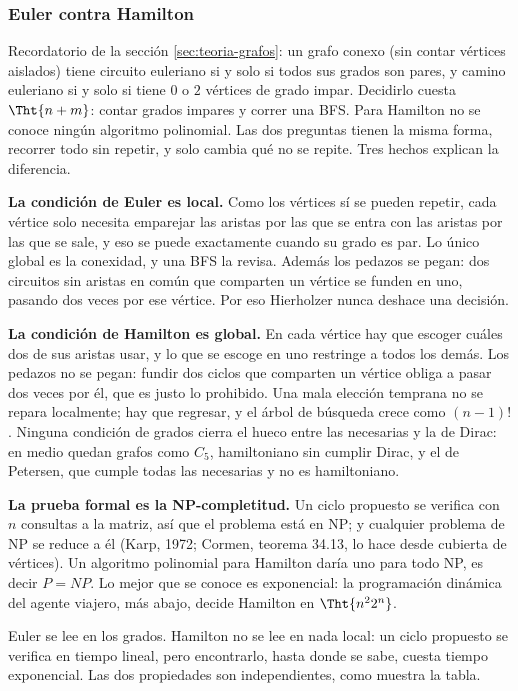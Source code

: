 \documentclass[11pt,letterpaper]{article}
\begin{document}

\subsubsection*{Euler contra Hamilton}

Recordatorio de la sección \ref{sec:teoria-grafos}: un grafo conexo
(sin contar vértices aislados) tiene circuito euleriano si y solo si
todos sus grados son pares, y camino euleriano si y solo si tiene $0$
o $2$ vértices de grado impar. Decidirlo cuesta $\Tht{n + m}$: contar
grados impares y correr una BFS. Para Hamilton no se conoce ningún
algoritmo polinomial. Las dos preguntas tienen la misma forma,
recorrer todo sin repetir, y solo cambia qué no se repite. Tres
hechos explican la diferencia.

\textbf{La condición de Euler es local.} Como los vértices sí se
pueden repetir, cada vértice solo necesita emparejar las aristas por
las que se entra con las aristas por las que se sale, y eso se puede
exactamente cuando su grado es par. Lo único global es la conexidad,
y una BFS la revisa. Además los pedazos se pegan: dos circuitos sin
aristas en común que comparten un vértice se funden en uno, pasando
dos veces por ese vértice. Por eso Hierholzer nunca deshace una
decisión.

\textbf{La condición de Hamilton es global.} En cada vértice hay que
escoger cuáles dos de sus aristas usar, y lo que se escoge en uno
restringe a todos los demás. Los pedazos no se pegan: fundir dos
ciclos que comparten un vértice obliga a pasar dos veces por él, que
es justo lo prohibido. Una mala elección temprana no se repara
localmente; hay que regresar, y el árbol de búsqueda crece como
$(n-1)!$. Ninguna condición de grados cierra el hueco entre las
necesarias y la de Dirac: en medio quedan grafos como $C_5$,
hamiltoniano sin cumplir Dirac, y el de Petersen, que cumple todas
las necesarias y no es hamiltoniano.

\textbf{La prueba formal es la NP-completitud.} Un ciclo propuesto se
verifica con $n$ consultas a la matriz, así que el problema está en
NP; y cualquier problema de NP se reduce a él (Karp, 1972; Cormen,
teorema 34.13, lo hace desde cubierta de vértices). Un algoritmo
polinomial para Hamilton daría uno para todo NP, es decir $P = NP$.
Lo mejor que se conoce es exponencial: la programación dinámica del
agente viajero, más abajo, decide Hamilton en $\Tht{n^2 2^n}$.

\begin{idea}
  Euler se lee en los grados. Hamilton no se lee en nada local: un
  ciclo propuesto se verifica en tiempo lineal, pero encontrarlo,
  hasta donde se sabe, cuesta tiempo exponencial. Las dos propiedades
  son independientes, como muestra la tabla.
\end{idea}
\end{document}
